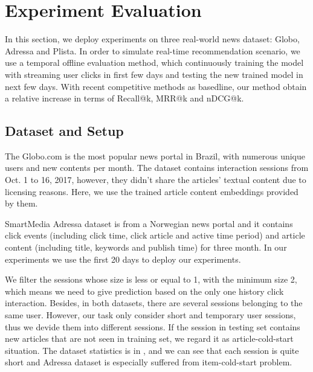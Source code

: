 \section{Experiment Evaluation}
In this section, we deploy experiments on three real-world news dataset: Globo, Adressa and Plista. In order to simulate real-time recommendation scenario, we use a temporal offline evaluation method, which continuously training the model with streaming user clicks in first few days and testing the new trained model in next few days. With recent competitive methods as basedline, our method obtain a relative increase in terms of Recall@k, MRR@k and nDCG@k.

\subsection{Dataset and Setup}
The Globo.com \cite{moreira_news_2018} is the most popular news portal in Brazil, with numerous unique users and new contents per month. The dataset contains interaction sessions from Oct. 1 to 16, 2017, however, they didn't share the articles' textual content due to licensing reasons. Here, we use the trained article content embeddings provided by them.

SmartMedia Adressa dataset \cite{gulla_adressa_2017} is from a Norwegian news portal and it contains click events (including click time, click article and active time period) and article content (including title, keywords and publish time) for three month. In our experiments we use the first 20 days to deploy our experiments. 


We filter the sessions whose size is less or equal to 1, with the minimum size 2, which means we need to give prediction based on the only one history click interaction. Besides, in both datasets, there are several sessions belonging to the same user. However, our task only consider short and temporary user sessions, thus we devide them into different sessions. If the session in testing set contains new articles that are not seen in training set, we regard it as article-cold-start situation. The dataset statistics is in , and we can see that each session is quite short and Adressa dataset is especially suffered from item-cold-start problem.

